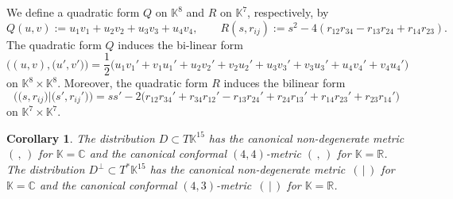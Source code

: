 \documentclass[11pt]{article}
\numberwithin{equation}{section}
\numberwithin{equation}{section}
\newtheorem{Corollary}[Theorem]{Corollary}
\theoremstyle{definition}
\newcommand{\R}{\mathbb{R}}
\newcommand{\C}{\mathbb{C}}
\newcommand{\KK}{\mathbb{K}}
\newcommand{\0}{\boldsymbol{0}}
\begin{document}
We define a quadratic form $Q$ on $\KK^8$ and $R$ on $\KK^7$, respectively, by
\[
Q(u, v) := u_1v_1 + u_2v_2 + u_3v_3 + u_4v_4, \qquad R(s, r_{ij}) := s^2 - 4(r_{12}r_{34} - r_{13}r_{24} + r_{14}r_{23}).
\]
The quadratic form $Q$ induces the bi-linear form
\[
\bigl((u, v), \bigl(u', v'\bigr)\bigr) =
\frac{1}{2}\bigl( u_1v_1' + v_1u_1' + u_2v_2' + v_2u_2' + u_3v_3' + v_3u_3' + u_4v_4' + v_4u_4'\bigr)
\]
on $\KK^8 \times \KK^8$. Moreover, the quadratic form $R$ induces the bilinear form
\[
\bigl(\bigl(s, r_{ij}\bigr) \vert \bigl(s', r_{ij}'\bigr)\bigr) = ss' - 2\bigl( r_{12}r_{34}' + r_{34}r_{12}' - r_{13}r_{24}' + r_{24}r_{13}' + r_{14}r_{23}' + r_{23}r_{14}'\bigr)
\]
on $\KK^7\times \KK^7$.

\begin{Corollary}
\label{Conformal-metrics}
The distribution $D \subset T\KK^{15}$ has the canonical non-degenerate metric $(\, ,\, )$ for ${\KK = \C}$ and
the canonical conformal $(4, 4)$-metric $(\, ,\, )$ for $\KK = \R$.
The distribution ${D^\perp \subset T^*\KK^{15}}$ has the canonical non-degenerate metric~$(\, \vert \, )$ for $\KK = \C$ and
the canonical conformal $(4, 3)$-metric~$(\, \vert \, )$ for $\KK = \R$.
\end{Corollary}
\end{document}
